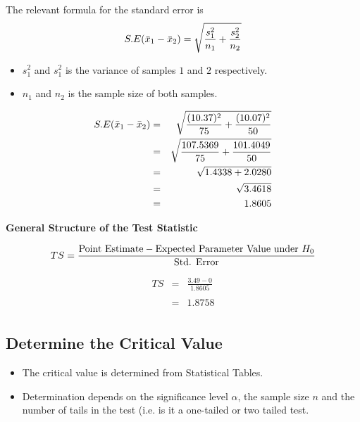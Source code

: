 \documentclass[a4paper,12pt]{article}
\begin{document}
\begin{framed}
 The relevant formula for the standard error is
\[ S.E(\bar{x}_1 - \bar{x}_2) = \sqrt{{s^2_1\over n_1}+{s^2_2 \over n_2}} \]
\end{framed}
\bigskip


\begin{itemize}
\item $s^2_1$ and $s^2_1$ is the variance of samples $1$ and $2$ respectively.
\item $n_1$ and $n_2$ is the sample size of both samples.\bigskip

\end{itemize}
\begin{eqnarray*}
 S.E(\bar{x}_1 - \bar{x}_2) &=& \sqrt{{(10.37)^2 \over 75}+{(10.07)^2 \over 50}}   \\
&=& \sqrt{{107.5369 \over 75}+{101.4049 \over 50}}   \\
&=& \sqrt{1.4338 + 2.0280}   \\
&=& \sqrt{3.4618} \\
&=& 1.8605 \\
\end{eqnarray*}
\newpage 

\noindent \textbf{General Structure of the Test Statistic}
\begin{framed}
\[ TS = {\mbox{Point Estimate} - \mbox{Expected Parameter Value under $H_{0}$} \over \mbox{Std. Error}}\]
\end{framed}

\begin{eqnarray*}
TS &=& \frac{ 3.49 - 0 }{1.8605}\\
& & \\
&=& 1.8758\\
\end{eqnarray*}
\newpage 
\subsection*{Determine the Critical Value}

\begin{itemize}
\item The critical value is determined from Statistical Tables.
\item Determination depends on the significance level $\alpha$, the sample size $n$ and the number of tails in the test (i.e. is it a one-tailed or two tailed test.
\end{itemize}
\end{document}
